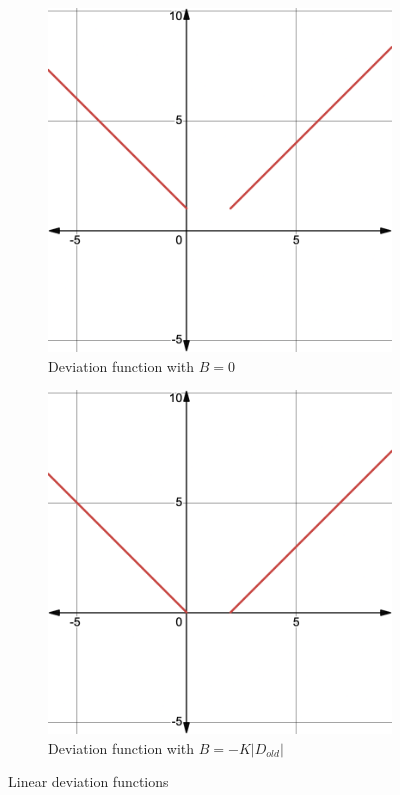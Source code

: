 \begin{figure}[h!]
	\centering
	\begin{subfigure}{0.4\textwidth}
		\centering
		\includegraphics[width=\linewidth]{deviation_function_no_offset.png} 
		\caption{Deviation function with $B = 0$ }
		\label{fig:img1}
	\end{subfigure}
	\hfill 
	\begin{subfigure}{0.4\textwidth}
		\centering
		\includegraphics[width=\linewidth]{deviation_function_with_offset.png} 
		\caption{Deviation function with $B = - K \lvert D_{old} \rvert$ }
		\label{fig:img2}
	\end{subfigure}
    \caption{Linear deviation functions}
	\label{fig:img3}
\end{figure}
\FloatBarrier


